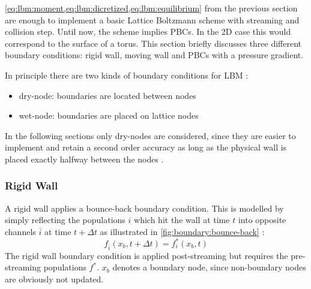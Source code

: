 \cref{eq:lbm:moment,eq:lbm:dicretized,eq:lbm:equilibrium} from the previous section are enough to implement a basic Lattice Boltzmann scheme with streaming and collision step. Until now, the scheme implies \glspl{PBC}. In the 2D case this would correspond to the surface of a torus. This section briefly discusses three different boundary conditions: rigid wall, moving wall and \glspl{PBC} with a pressure gradient.

In principle there are two kinds of boundary conditions for \gls{LBM} \cite{timm2016lattice}:
\begin{itemize}
    \item dry-node: boundaries are located between nodes
    \item wet-node: boundaries are placed on lattice nodes
\end{itemize}
In the following sections only dry-nodes are considered, since they are easier to implement and retain a second order accuracy as long as the physical wall is placed exactly halfway between the nodes \cite{timm2016lattice}.

\subsubsection{Rigid Wall}

A rigid wall applies a bounce-back boundary condition\cite{timm2016lattice}. This is modelled by simply reflecting the populations $i$ which hit the wall at time $t$ into opposite channels $\overline{i}$ at time $t + \Delta t$ as illustrated in \cref{fig:boundary:bounce-back} \cite{timm2016lattice}:
\begin{equation}
    f_{\overline{i}}(x_b,t+\Delta t) = f_i^*(x_b,t)
    \label{eq:boundary:rigid}
\end{equation}
The rigid wall boundary condition is applied post-streaming but requires the pre-streaming populations $f^*$. $x_b$ denotes a boundary node, since non-boundary nodes are obviously not updated.

